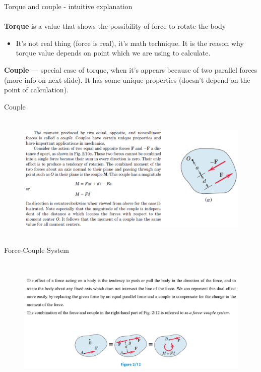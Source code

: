 \documentclass[aspectratio=169]{beamer}
\begin{document}
    \begin{frame}[t]{Torque and couple - intuitive explanation}
    \framesubtitle{}
        \begin{minipage}{0.8\textwidth}
            \textbf{Torque} is a value that shows the possibility of force to 
            rotate the body
            \begin{itemize}
                \item It’s not real thing (force is real), it’s math technique. 
                It is the reason why torque value depends on point 
                which we are using to calculate.
            \end{itemize}
            \textbf{Couple} — special case of torque, when it’s appears 
            because of two parallel forces (more info on next slide). 
            It has some unique properties (doesn’t depend on the 
            point of calculation).
        \end{minipage}
    \end{frame}
    
    \begin{frame}[t]{Couple}
    \framesubtitle{}
        \vspace{-0.6cm}
        \begin{figure}[H]
            \centering\includegraphics[height=6cm,width=1\textwidth,keepaspectratio]{image8.png}
            \label{fig:image8}
        \end{figure}
    \end{frame}
    
    \begin{frame}[t]{Force-Couple System    }
    \framesubtitle{}
        \vspace{-0.6cm}
        \begin{figure}[H]
            \centering\includegraphics[height=6cm,width=1\textwidth,keepaspectratio]{image13.png}
            \label{fig:image13}
        \end{figure}
    \end{frame}
\end{document}
